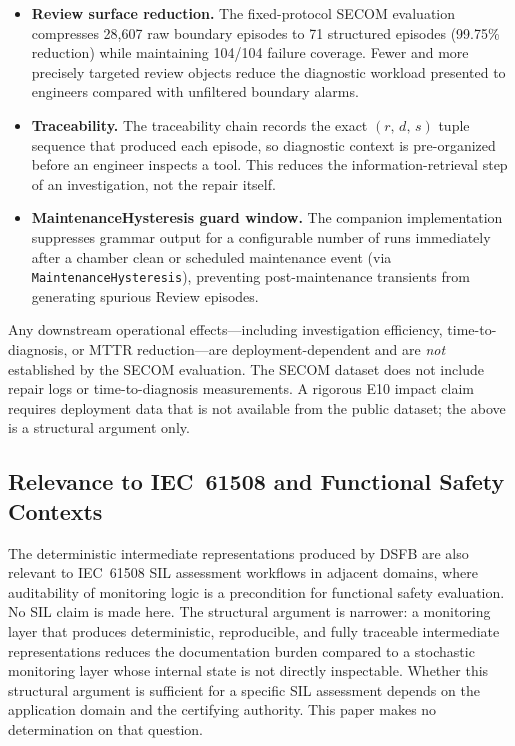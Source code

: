 \documentclass[11pt,letterpaper]{article}
\theoremstyle{scresult}
\begin{document}
\begin{itemize}
  \item \textbf{Review surface reduction.} The fixed-protocol SECOM evaluation
        compresses 28{,}607 raw boundary episodes to 71 structured episodes
        (99.75\% reduction) while maintaining 104/104 failure coverage. Fewer
        and more precisely targeted review objects reduce the diagnostic
        workload presented to engineers compared with unfiltered boundary alarms.
  \item \textbf{Traceability.} The traceability chain records the exact
        $(r,\,d,\,s)$ tuple sequence that produced each episode, so diagnostic
        context is pre-organized before an engineer inspects a tool. This reduces
        the information-retrieval step of an investigation, not the repair itself.
  \item \textbf{MaintenanceHysteresis guard window.} The companion
        implementation suppresses grammar output for a configurable number of
        runs immediately after a chamber clean or scheduled maintenance event
        (via \texttt{MaintenanceHysteresis}), preventing post-maintenance
        transients from generating spurious Review episodes.
\end{itemize}

Any downstream operational effects---including investigation efficiency,
time-to-diagnosis, or MTTR reduction---are deployment-dependent and are
\emph{not} established by the SECOM evaluation. The SECOM dataset does not
include repair logs or time-to-diagnosis measurements. A rigorous E10 impact
claim requires deployment data that is not available from the public dataset;
the above is a structural argument only.

\subsection{Relevance to IEC~61508 and Functional Safety Contexts}

The deterministic intermediate representations produced by DSFB are also
relevant to IEC~61508 SIL assessment workflows in adjacent domains, where
auditability of monitoring logic is a precondition for functional safety
evaluation. No SIL claim is made here. The structural argument is narrower:
a monitoring layer that produces deterministic, reproducible, and fully
traceable intermediate representations reduces the documentation burden compared
to a stochastic monitoring layer whose internal state is not directly
inspectable. Whether this structural argument is sufficient for a specific SIL
assessment depends on the application domain and the certifying authority.
This paper makes no determination on that question.
\end{document}
